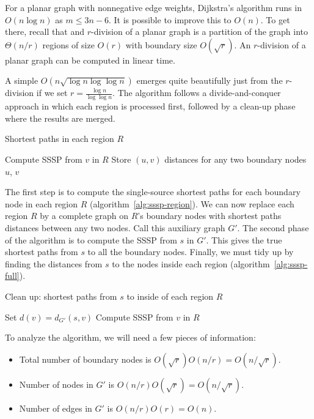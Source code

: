 \documentclass[12pt]{article}
\begin{document}
For a planar graph with nonnegative edge weights, Dijkstra's algorithm runs in $O(n \log n)$ as $m \leq 3n - 6$. It is possible to improve this to $O(n)$. To get there, recall that and $r$-division of a planar graph is a partition of the graph into $\Theta(n/r)$ regions of size $O(r)$ with boundary size $O(\sqrt{r})$. An $r$-division of a planar graph can be computed in linear time.

A simple $O(n\sqrt{\log n \log \log n})$ emerges quite beautifully just from the $r$-division if we set $r = \frac{\log n}{\log \log n}$. The algorithm follows a divide-and-conquer approach in which each region is processed first, followed by a clean-up phase where the results are merged.

\begin{algorithm}[!htb]
  \caption{Shortest paths in each region $R$}
  \label{alg:sssp-region}
  \begin{algorithmic}
        \State Compute SSSP from $v$ in $R$
        \State Store $(u,v)$ distances for any two boundary nodes $u$, $v$
      \EndFor
    \EndFor
  \end{algorithmic}
\end{algorithm}

The first step is to compute the single-source shortest paths for each boundary node in each region $R$ (algorithm~\ref{alg:sssp-region}). We can now replace each region $R$ by a complete graph on $R$'s boundary nodes with shortest paths distances between any two nodes. Call this auxiliary graph $G'$. The second phase of the algorithm is to compute the SSSP from $s$ in $G'$. This gives the true shortest paths from $s$ to all the boundary nodes. Finally, we must tidy up by finding the distances from $s$ to the nodes inside each region (algorithm~\ref{alg:sssp-full}).

\begin{algorithm}[!htb]
  \caption{Clean up: shortest paths from $s$ to inside of each region $R$}
  \label{alg:sssp-full}
  \begin{algorithmic}
        \State Set $d(v) = d_{G'}(s,v)$
        \State Compute SSSP from $v$ in $R$
      \EndFor
    \EndFor
  \end{algorithmic}
\end{algorithm}

To analyze the algorithm, we will need a few pieces of information:
\begin{itemize}
\item Total number of boundary nodes is $O(\sqrt{r})O(n/r) = O(n/\sqrt{r})$.
\item Number of nodes in $G'$ is $O(n/r)O(\sqrt{r})=O(n/\sqrt{r})$.
\item Number of edges in $G'$ is $O(n/r)O(r) = O(n)$.
\end{itemize}
\end{document}

